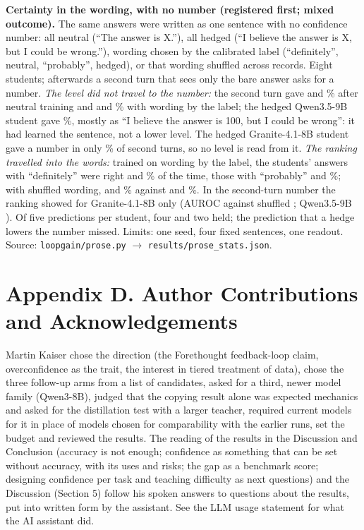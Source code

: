 \documentclass[10pt]{article}
\begin{document}
\textbf{Certainty in the wording, with no number (registered first; mixed outcome).} The same answers were written as one sentence with no confidence number: all neutral (``The answer is X.''), all hedged (``I believe the answer is X, but I could be wrong.''), wording chosen by the calibrated label (``definitely'', neutral, ``probably'', hedged), or that wording shuffled across records. Eight students; afterwards a second turn that sees only the bare answer asks for a number. \emph{The level did not travel to the number:} the second turn gave \zQSaysA{} and \zGSaysA{}\% after neutral training and \zQSaysD{} and \zGSaysD{}\% with wording by the label; the hedged Qwen3.5-9B student gave \zQSaysC{}\%, mostly as ``I believe the answer is 100, but I could be wrong'': it had learned the sentence, not a lower level. The hedged Granite-4.1-8B student gave a number in only \zGNumC{}\% of second turns, so no level is read from it. \emph{The ranking travelled into the words:} trained on wording by the label, the students' answers with ``definitely'' were right \zQDefD{} and \zGDefD{}\% of the time, those with ``probably'' \zQProbD{} and \zGProbD{}\%; with shuffled wording, \zQDefE{} and \zGDefE{}\% against \zQProbE{} and \zGProbE{}\%. In the second-turn number the ranking showed for Granite-4.1-8B only (AUROC against shuffled \zGAurocDE{}; Qwen3.5-9B \zQAurocDE{}). Of five predictions per student, four and two held; the prediction that a hedge lowers the number missed. Limits: one seed, four fixed sentences, one readout. Source: \texttt{loopgain/prose.py} $\to$ \texttt{results/prose\_stats.json}.

\section*{Appendix D. Author Contributions and Acknowledgements}
Martin Kaiser chose the direction (the Forethought feedback-loop claim, overconfidence as the trait, the interest in tiered treatment of data), chose the three follow-up arms from a list of candidates, asked for a third, newer model family (Qwen3-8B), judged that the copying result alone was expected mechanics and asked for the distillation test with a larger teacher, required current models for it in place of models chosen for comparability with the earlier runs, set the budget and reviewed the results. The reading of the results in the Discussion and Conclusion (accuracy is not enough; confidence as something that can be set without accuracy, with its uses and risks; the gap as a benchmark score; designing confidence per task and teaching difficulty as next questions) and the Discussion (Section 5) follow his spoken answers to questions about the results, put into written form by the assistant. See the LLM usage statement for what the AI assistant did.
\end{document}
